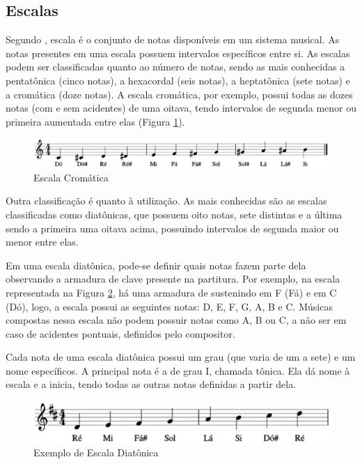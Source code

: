     \subsection[Escalas]{Escalas}

      Segundo , escala é o conjunto de notas disponíveis em um sistema musical. As notas presentes em uma escala possuem intervalos específicos entre si. As escalas podem ser classificadas quanto ao número de notas, sendo as mais conhecidas a pentatônica (cinco notas), a hexacordal (seis notas), a heptatônica (sete notas) e a cromática (doze notas). A escala cromática, por exemplo, possui todas as dozes notas (com e sem acidentes) de uma oitava, tendo intervalos de segunda menor ou primeira aumentada entre elas (Figura \ref{cromatica}).

      \begin{figure}[htb]
        \centering
        \includegraphics[scale=0.5]{figuras/cromatica.eps}
        \caption{Escala Cromática}
        \label{cromatica}
      \end{figure}

      Outra classificação é quanto à utilização. As mais conhecidas são as escalas classificadas como diatônicas, que possuem oito notas, sete distintas e a última sendo a primeira uma oitava acima, possuindo intervalos de segunda maior ou menor entre elas.

      Em uma escala diatônica, pode-se definir quais notas fazem parte dela observando a armadura de clave presente na partitura. Por exemplo, na escala representada na Figura \ref{escaladiatonica}, há uma armadura de sustenindo em F (Fá) e em C (Dó), logo, a escala possui as seguintes notas: D, E, F\sh, G, A, B e C\sh. Músicas compostas nessa escala não podem possuir notas como A\fl, B\sh{} ou C, a não ser em caso de acidentes pontuais, definidos pelo compositor.

      Cada nota de uma escala diatônica possui um grau (que varia de um a sete) e um nome específicos. A principal nota é a de grau I, chamada tônica. Ela dá nome à escala e a inicia, tendo todas as outras notas definidas a partir dela.

      \begin{figure}[htb]
        \centering
        \includegraphics[scale=0.6]{figuras/escalaremaior.eps}
        \caption{Exemplo de Escala Diatônica}
        \label{escaladiatonica}
      \end{figure}

